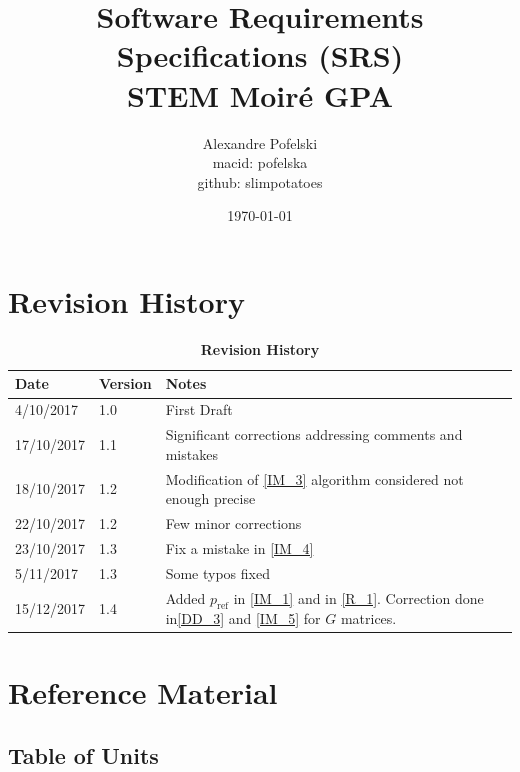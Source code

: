 \documentclass[12pt]{article}
\begin{document}
\title{Software Requirements Specifications (SRS) \\
STEM Moir{\'e} GPA} 
\author{Alexandre Pofelski \\
		macid: pofelska \\
		github: slimpotatoes}
\date{\today}

\maketitle

\clearpage

\tableofcontents

\clearpage

\section{Revision History}

\begin{table}[h]
\caption{\bf Revision History}
\begin{tabularx}{\textwidth}{p{3cm}p{2cm}X}
\toprule {\bf Date} & {\bf Version} & {\bf Notes}\\
\midrule
4/10/2017 & 1.0 & First Draft\\
17/10/2017 & 1.1 & Significant corrections addressing comments and mistakes\\
18/10/2017 & 1.2 & Modification of \cref{IM_3} algorithm considered not enough 
precise\\
22/10/2017 & 1.2 & Few minor corrections\\
23/10/2017 & 1.3 & Fix a mistake in \cref{IM_4}\\
5/11/2017 & 1.3 & Some typos fixed\\
15/12/2017 & 1.4 & Added $p_{\text{ref}}$ in \cref{IM_1} and in \cref{R_1}. 
Correction done in\cref{DD_3} and \cref{IM_5} for $G$ matrices. \\

\bottomrule
\end{tabularx}
\end{table}

\clearpage

\section{Reference Material}

\subsection{Table of Units}
\end{document}
